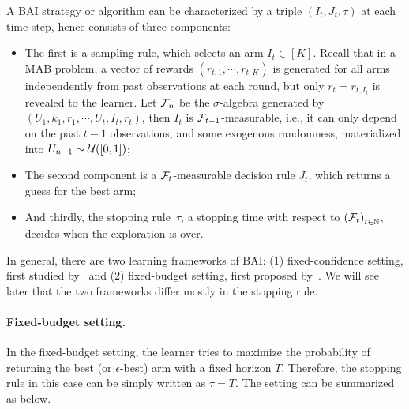 A BAI strategy or algorithm can be characterized by a triple $(I_t, J_t, \tau)$ at each time step, hence consists of three components: 
\begin{itemize}
    \item The first is a \gls{sampling rule}, which selects an arm $I_t\in[K]$. Recall that in a MAB problem, a vector of rewards $(r_{t,1},\cdots,r_{t,K})$ is generated for all arms independently from past observations at each round, but only $r_t = r_{t,I_t}$ is revealed to the learner. Let $\mathcal{F}_n$ be the $\sigma$-algebra generated by $(U_1,k_1,r_1,\cdots,U_t,I_t,r_t)$, then $I_t$ is $\mathcal{F}_{t-1}$-measurable, i.e., it can only depend on the past $t-1$ observations, and some exogenous randomness, materialized into $U_{n-1} \sim \mathcal{U}([0,1])$;
    \item The second component is a $\mathcal{F}_{t}$-measurable \gls{decision rule} $J_t$, which returns a guess for the best arm;
    \item And thirdly, the \gls{stopping rule}~$\tau$, a stopping time with respect to $\left(\mathcal{F}_{t}\right)_{t \in \mathbb{N}}$, decides when the exploration is over.
\end{itemize}

In general, there are two learning frameworks of BAI: (1) \gls{fixed-confidence setting}, first studied by~\citep{even-dar2003confidence} and (2) \gls{fixed-budget setting}, first proposed by~\citep{audibert2010budget}. We will see later that the two frameworks differ mostly in the stopping rule.

\paragraph{Fixed-budget setting.}

In the fixed-budget setting, the learner tries to maximize the probability of returning the best (or $\epsilon$-best) arm with a fixed horizon $T$. Therefore, the stopping rule in this case can be simply written as $\tau=T$. The setting can be summarized as below.


